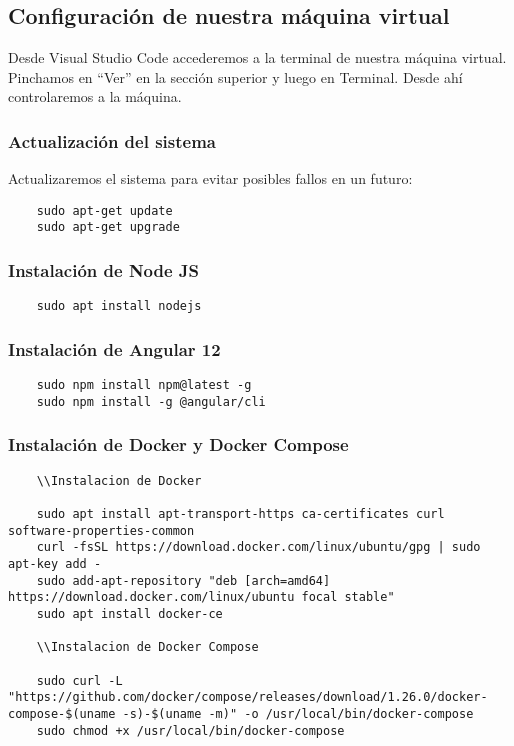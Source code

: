 \subsection{Configuración de nuestra máquina virtual}

Desde Visual Studio Code accederemos a la terminal de nuestra máquina virtual. Pinchamos en ``Ver'' en la sección superior y luego en Terminal. Desde ahí controlaremos a la máquina.

\subsubsection{Actualización del sistema}
Actualizaremos el sistema para evitar posibles fallos en un futuro:
\begin{verbatim}
    sudo apt-get update
    sudo apt-get upgrade
\end{verbatim}

\subsubsection{Instalación de Node JS}
\begin{verbatim}
    sudo apt install nodejs
\end{verbatim}

\subsubsection{Instalación de Angular 12}
\begin{verbatim}
    sudo npm install npm@latest -g
    sudo npm install -g @angular/cli
\end{verbatim}

\subsubsection{Instalación de Docker y Docker Compose}
\begin{verbatim}
    \\Instalacion de Docker

    sudo apt install apt-transport-https ca-certificates curl software-properties-common
    curl -fsSL https://download.docker.com/linux/ubuntu/gpg | sudo apt-key add -
    sudo add-apt-repository "deb [arch=amd64] https://download.docker.com/linux/ubuntu focal stable"
    sudo apt install docker-ce

    \\Instalacion de Docker Compose

    sudo curl -L "https://github.com/docker/compose/releases/download/1.26.0/docker-compose-$(uname -s)-$(uname -m)" -o /usr/local/bin/docker-compose
    sudo chmod +x /usr/local/bin/docker-compose
\end{verbatim}

